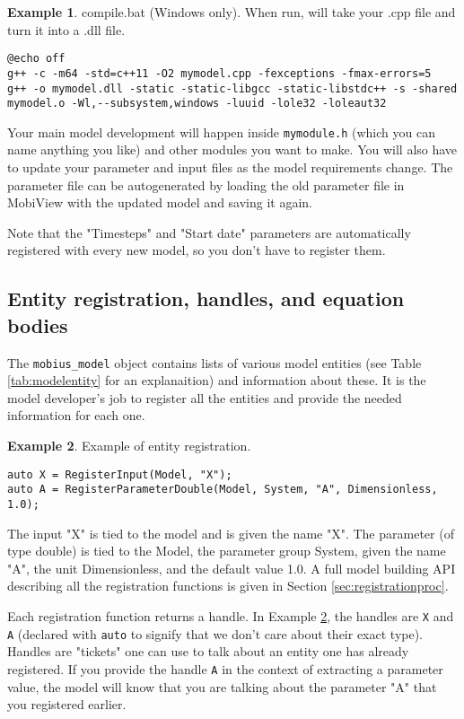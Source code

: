 \documentclass[11pt]{article}
\theoremstyle{definition}
\newtheorem{myexample}{Example}
\newenvironment{example}%
  {\begin{lrbox}{\examplebox}%
   \begin{minipage}{\dimexpr\linewidth-2\fboxsep}
   \begin{myexample}}%
  {\end{myexample}%
   \end{minipage}%
   \end{lrbox}%
   \begin{trivlist}
     \item[]\colorbox{silver}{\usebox\examplebox}
   \end{trivlist}}
\begin{document}
\begin{example}
compile.bat  (Windows only). When run, will take your .cpp file and turn it into a .dll file.
\begin{lstlisting}[style=textstyle]
@echo off
g++ -c -m64 -std=c++11 -O2 mymodel.cpp -fexceptions -fmax-errors=5
g++ -o mymodel.dll -static -static-libgcc -static-libstdc++ -s -shared mymodel.o -Wl,--subsystem,windows -luuid -lole32 -loleaut32
\end{lstlisting}
\end{example}

Your main model development will happen inside {\tt mymodule.h} (which you can name anything you like) and other modules you want to make. You will also have to update your parameter and input files as the model requirements change. The parameter file can be autogenerated by loading the old parameter file in MobiView with the updated model and saving it again.

Note that the "Timesteps" and "Start date" parameters are automatically registered with every new model, so you don't have to register them.

\subsection{Entity registration, handles, and equation bodies}\label{sec:registrationandhandles}

The {\tt mobius\_model} object contains lists of various model entities (see Table \ref{tab:modelentity} for an explanaition) and information about these. It is the model developer's job to register all the entities and provide the needed information for each one.

\begin{example}\label{ex:registration}
Example of entity registration.
\begin{lstlisting}[style=mycpp]
auto X = RegisterInput(Model, "X");
auto A = RegisterParameterDouble(Model, System, "A", Dimensionless, 1.0);
\end{lstlisting}
The input "X" is tied to the model and is given the name "X". The parameter (of type double) is tied to the Model, the parameter group System, given the name "A", the unit Dimensionless, and the default value 1.0. A full model building API describing all the registration functions is given in Section \ref{sec:registrationproc}.
\end{example}

Each registration function returns a handle. In Example \ref{ex:registration}, the handles are {\tt X} and {\tt A} (declared with {\tt auto} to signify that we don't care about their exact type). Handles are "tickets" one can use to talk about an entity one has already registered. If you provide the handle {\tt A} in the context of extracting a parameter value, the model will know that you are talking about the parameter "A" that you registered earlier.
\end{document}
